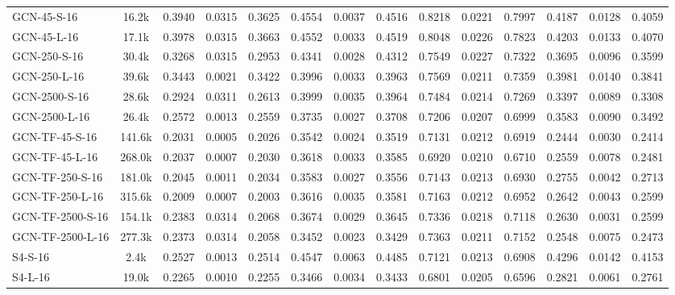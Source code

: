 \begin{table*}[h]
{\begin{tabular}{l c >{\columncolor{gray!20}}ccc >{\columncolor{gray!20}}ccc >{\columncolor{gray!20}}ccc >{\columncolor{gray!20}}ccc}
            \hline
            GCN-45-S-16 & 16.2k & 0.3940 & 0.0315 & 0.3625 & 0.4554 & 0.0037 & 0.4516 & 0.8218 & 0.0221 & 0.7997 & 0.4187 & 0.0128 & 0.4059 \\
            GCN-45-L-16 & 17.1k & 0.3978 & 0.0315 & 0.3663 & 0.4552 & 0.0033 & 0.4519 & 0.8048 & 0.0226 & 0.7823 & 0.4203 & 0.0133 & 0.4070 \\
            GCN-250-S-16 & 30.4k & 0.3268 & 0.0315 & 0.2953 & 0.4341 & 0.0028 & 0.4312 & 0.7549 & 0.0227 & 0.7322 & 0.3695 & 0.0096 & 0.3599 \\
            GCN-250-L-16 & 39.6k & 0.3443 & 0.0021 & 0.3422 & 0.3996 & 0.0033 & 0.3963 & 0.7569 & 0.0211 & 0.7359 & 0.3981 & 0.0140 & 0.3841 \\
            GCN-2500-S-16 & 28.6k & 0.2924 & 0.0311 & 0.2613 & 0.3999 & 0.0035 & 0.3964 & 0.7484 & 0.0214 & 0.7269 & 0.3397 & 0.0089 & 0.3308 \\
            GCN-2500-L-16 & 26.4k & 0.2572 & 0.0013 & 0.2559 & 0.3735 & 0.0027 & 0.3708 & 0.7206 & 0.0207 & 0.6999 & 0.3583 & 0.0090 & 0.3492 \\
            \hline
            GCN-TF-45-S-16 & 141.6k & 0.2031 & 0.0005 & 0.2026 & 0.3542 & 0.0024 & 0.3519 & 0.7131 & 0.0212 & 0.6919 & 0.2444 & 0.0030 & 0.2414 \\
            GCN-TF-45-L-16 & 268.0k & 0.2037 & 0.0007 & 0.2030 & 0.3618 & 0.0033 & 0.3585 & 0.6920 & 0.0210 & 0.6710 & 0.2559 & 0.0078 & 0.2481 \\
            GCN-TF-250-S-16 & 181.0k & 0.2045 & 0.0011 & 0.2034 & 0.3583 & 0.0027 & 0.3556 & 0.7143 & 0.0213 & 0.6930 & 0.2755 & 0.0042 & 0.2713 \\
            GCN-TF-250-L-16 & 315.6k & 0.2009 & 0.0007 & 0.2003 & 0.3616 & 0.0035 & 0.3581 & 0.7163 & 0.0212 & 0.6952 & 0.2642 & 0.0043 & 0.2599 \\
            GCN-TF-2500-S-16 & 154.1k & 0.2383 & 0.0314 & 0.2068 & 0.3674 & 0.0029 & 0.3645 & 0.7336 & 0.0218 & 0.7118 & 0.2630 & 0.0031 & 0.2599 \\
            GCN-TF-2500-L-16 & 277.3k & 0.2373 & 0.0314 & 0.2058 & 0.3452 & 0.0023 & 0.3429 & 0.7363 & 0.0211 & 0.7152 & 0.2548 & 0.0075 & 0.2473 \\
            \hline
            S4-S-16 & 2.4k & 0.2527 & 0.0013 & 0.2514 & 0.4547 & 0.0063 & 0.4485 & 0.7121 & 0.0213 & 0.6908 & 0.4296 & 0.0142 & 0.4153 \\
            S4-L-16 & 19.0k & 0.2265 & 0.0010 & 0.2255 & 0.3466 & 0.0034 & 0.3433 & 0.6801 & 0.0205 & 0.6596 & 0.2821 & 0.0061 & 0.2761 \\

\end{tabular}}
\end{table*}

